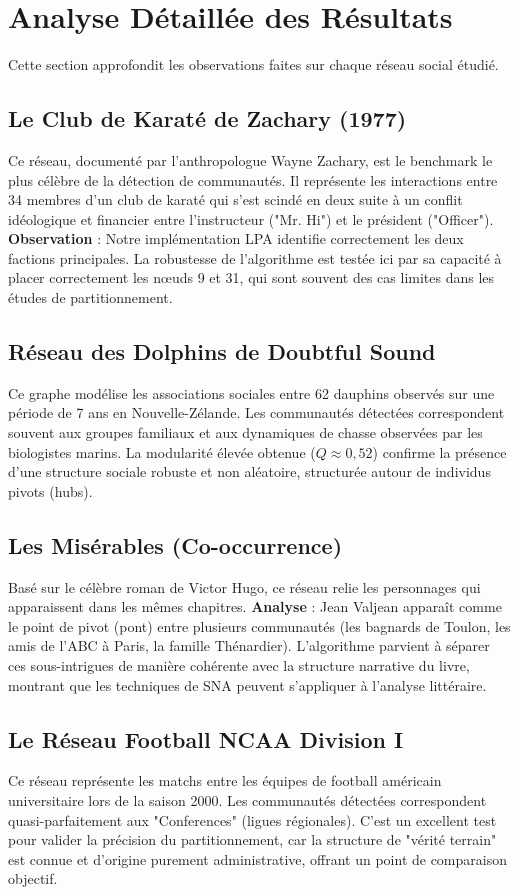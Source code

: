 \documentclass[12pt,a4paper]{report}
\begin{document}
\chapter{Analyse Détaillée des Résultats}
Cette section approfondit les observations faites sur chaque réseau social étudié.

\section{Le Club de Karaté de Zachary (1977)}
Ce réseau, documenté par l'anthropologue Wayne Zachary, est le benchmark le plus célèbre de la détection de communautés. Il représente les interactions entre 34 membres d'un club de karaté qui s'est scindé en deux suite à un conflit idéologique et financier entre l'instructeur ("Mr. Hi") et le président ("Officer"). 
\textbf{Observation} : Notre implémentation LPA identifie correctement les deux factions principales. La robustesse de l'algorithme est testée ici par sa capacité à placer correctement les nœuds 9 et 31, qui sont souvent des cas limites dans les études de partitionnement.

\section{Réseau des Dolphins de Doubtful Sound}
Ce graphe modélise les associations sociales entre 62 dauphins observés sur une période de 7 ans en Nouvelle-Zélande. Les communautés détectées correspondent souvent aux groupes familiaux et aux dynamiques de chasse observées par les biologistes marins. La modularité élevée obtenue ($Q \approx 0,52$) confirme la présence d'une structure sociale robuste et non aléatoire, structurée autour de individus pivots (hubs).

\section{Les Misérables (Co-occurrence)}
Basé sur le célèbre roman de Victor Hugo, ce réseau relie les personnages qui apparaissent dans les mêmes chapitres. 
\textbf{Analyse} : Jean Valjean apparaît comme le point de pivot (pont) entre plusieurs communautés (les bagnards de Toulon, les amis de l'ABC à Paris, la famille Thénardier). L'algorithme parvient à séparer ces sous-intrigues de manière cohérente avec la structure narrative du livre, montrant que les techniques de SNA peuvent s'appliquer à l'analyse littéraire.

\section{Le Réseau Football NCAA Division I}
Ce réseau représente les matchs entre les équipes de football américain universitaire lors de la saison 2000. Les communautés détectées correspondent quasi-parfaitement aux "Conferences" (ligues régionales). C'est un excellent test pour valider la précision du partitionnement, car la structure de "vérité terrain" est connue et d'origine purement administrative, offrant un point de comparaison objectif.
\end{document}
